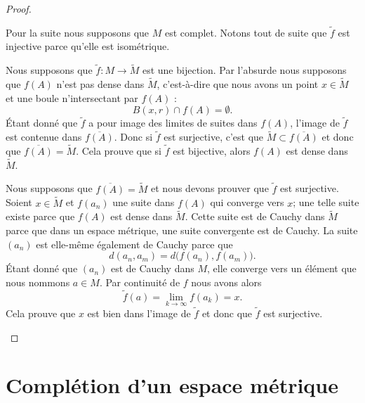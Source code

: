 \begin{proof}
\begin{subproof}
		Pour la suite nous supposons que \( M\) est complet. Notons tout de suite que \( \tilde f\) est injective parce qu'elle est isométrique.


		Nous supposons que \( \tilde f\colon M\to \tilde M\) est une bijection. Par l'absurde nous supposons que \( f(A)\) n'est pas dense dans \( \tilde M\), c'est-à-dire que nous avons un point \( x\in \tilde M\) et une boule n'intersectant par \( f(A)\) :
		\begin{equation}
			B(x,r)\cap f(A)=\emptyset.
		\end{equation}
		Étant donné que \( \tilde f\) a pour image des limites de suites dans \( f(A)\), l'image de \( \tilde f\) est contenue dans \( \overline{ f(A) }\). Donc si \( \tilde f\) est surjective, c'est que \( \tilde M\subset \overline{ f(A) }\) et donc que \( \overline{ f(A) }=\tilde M\). Cela prouve que si \( \tilde f\) est bijective, alors \( f(A)\) est dense dans \( \tilde M\).



		Nous supposons que \( \overline{ f(A) }=\tilde M\) et nous devons prouver que \( \tilde f\) est surjective. Soient \( x\in \tilde M\) et \( f(a_n)\) une suite dans \( f(A)\) qui converge vers \( x\); une telle suite existe parce que \( f(A)\) est dense dans \( \tilde M\). Cette suite est de Cauchy dans \( \tilde M\) parce que dans un espace métrique, une suite convergente est de Cauchy. La suite \( (a_n)\) est elle-même également de Cauchy parce que
		\begin{equation}
			d(a_n,a_m)=d\big( f(a_n),f(a_m) \big).
		\end{equation}
		Étant donné que \( (a_n)\) est de Cauchy dans \( M\), elle converge vers un élément que nous nommons \( a\in M\). Par continuité de \( f \) nous avons alors
		\begin{equation}
			\tilde f(a)=\lim_{k\to \infty} f(a_k)=x.
		\end{equation}
		Cela prouve que \( x\) est bien dans l'image de \( \tilde f\) et donc que \( \tilde f\) est surjective.
	\end{subproof}
\end{proof}

\section{Complétion d'un espace métrique}

